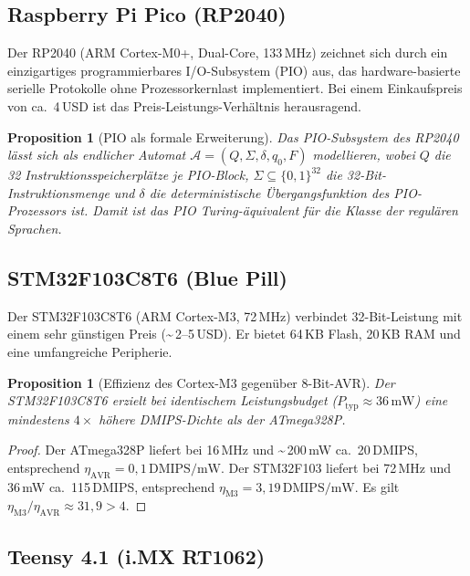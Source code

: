 ﻿\documentclass[12pt, a4paper]{article}
\theoremstyle{plain}
\newtheorem{proposition}[theorem]{Proposition}
\theoremstyle{definition}
\theoremstyle{remark}
\begin{document}
\subsection{Raspberry Pi Pico (RP2040)}

Der RP2040 (ARM Cortex-M0+, Dual-Core, 133\,MHz) zeichnet sich durch ein
einzigartiges programmierbares I/O-Subsystem (PIO) aus, das
hardware-basierte serielle Protokolle ohne Prozessorkernlast implementiert.
Bei einem Einkaufspreis von ca.\ 4\,USD ist das Preis-Leistungs-Verhältnis
herausragend.

\begin{proposition}[PIO als formale Erweiterung]
\label{prop:pio}
  Das PIO-Subsystem des RP2040 lässt sich als endlicher Automat
  $\mathcal{A} = (Q, \Sigma, \delta, q_0, F)$ modellieren, wobei
  $Q$ die 32 Instruktionsspeicherplätze je PIO-Block,
  $\Sigma \subseteq \{0,1\}^{32}$ die 32-Bit-Instruktionsmenge und
  $\delta$ die deterministische Übergangsfunktion des PIO-Prozessors ist.
  Damit ist das PIO Turing-äquivalent für die Klasse der regulären Sprachen.
\end{proposition}

\subsection{STM32F103C8T6 (Blue Pill)}

Der STM32F103C8T6 (ARM Cortex-M3, 72\,MHz) verbindet 32-Bit-Leistung mit
einem sehr günstigen Preis (\textasciitilde\,2--5\,USD).
Er bietet 64\,KB Flash, 20\,KB RAM und eine umfangreiche Peripherie.

\begin{proposition}[Effizienz des Cortex-M3 gegenüber 8-Bit-AVR]
\label{prop:cortex_m3}
  Der STM32F103C8T6 erzielt bei identischem Leistungsbudget
  ($P_\text{typ} \approx 36\,\text{mW}$) eine mindestens
  $4\times$ höhere DMIPS-Dichte als der ATmega328P.
\end{proposition}

\begin{proof}
  Der ATmega328P liefert bei 16\,MHz und \textasciitilde\,200\,mW ca.\ 20\,DMIPS,
  entsprechend $\eta_\text{AVR} = 0{,}1\,\text{DMIPS/mW}$.
  Der STM32F103 liefert bei 72\,MHz und 36\,mW ca.\ 115\,DMIPS,
  entsprechend $\eta_\text{M3} = 3{,}19\,\text{DMIPS/mW}$.
  Es gilt $\eta_\text{M3} / \eta_\text{AVR} \approx 31{,}9 > 4$.
 
\end{proof}

\subsection{Teensy 4.1 (i.MX RT1062)}
\end{document}
